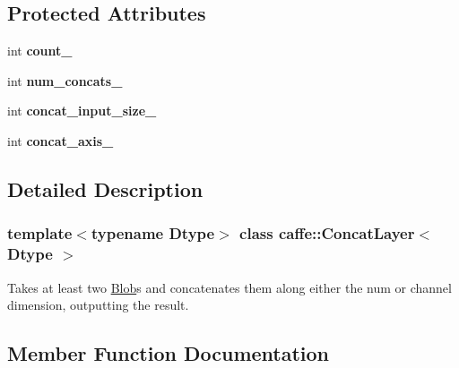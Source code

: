 \subsection*{Protected Attributes}
\begin{DoxyCompactItemize}
\item 
\mbox{\label{classcaffe_1_1_concat_layer_a2e8c2179da287e21df345183f431bd72}} 
int {\bfseries count\+\_\+}
\item 
\mbox{\label{classcaffe_1_1_concat_layer_a747feb42310ec1ffdead4cd96008aa8c}} 
int {\bfseries num\+\_\+concats\+\_\+}
\item 
\mbox{\label{classcaffe_1_1_concat_layer_acdc5e611cf16cbfacfd0d3f08f1ca27f}} 
int {\bfseries concat\+\_\+input\+\_\+size\+\_\+}
\item 
\mbox{\label{classcaffe_1_1_concat_layer_aaa475cbad6d1e5e681785e69bfc536ff}} 
int {\bfseries concat\+\_\+axis\+\_\+}
\end{DoxyCompactItemize}


\subsection{Detailed Description}
\subsubsection*{template$<$typename Dtype$>$\newline
class caffe\+::\+Concat\+Layer$<$ Dtype $>$}

Takes at least two \mbox{\hyperlink{classcaffe_1_1_blob}{Blob}}s and concatenates them along either the num or channel dimension, outputting the result. 

\subsection{Member Function Documentation}
\mbox{\label{classcaffe_1_1_concat_layer_a928a320b29e3f72ffcc661d00534f760}} 
